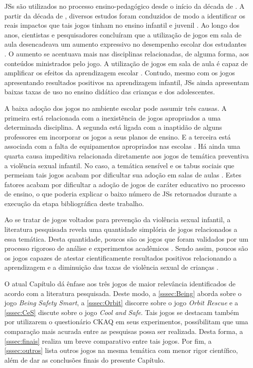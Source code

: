 \acfp{JS} são utilizados no processo ensino-pedagógico desde o início da década de \citeyear{clark1970serious}. A partir da década de \citeyear{clark1970serious}, diversos estudos foram conduzidos de modo a identificar os reais impactos que tais jogos tinham no ensino infantil e juvenil \cite{stieler2016paper}. Ao longo dos anos, cientistas e pesquisadores concluíram que a utilização de jogos em sala de aula desencadeava um aumento expressivo no desempenho escolar dos estudantes \cite{wentzel1998social}. O aumento se acentuava mais nas disciplinas relacionadas, de alguma forma, aos conteúdos ministrados pelo jogo. A utilização de jogos em sala de aula é capaz de amplificar os efeitos da aprendizagem escolar \cite{jones2020serious}. Contudo, mesmo com os jogos apresentando resultados positivos na aprendizagem infantil, \acp{JS} ainda apresentam baixas taxas de uso no ensino didático das crianças e dos adolescentes. 

A baixa adoção dos jogos no ambiente escolar pode assumir três causas. A primeira está relacionada com a inexistência de jogos apropriados a uma determinada disciplina. A segunda está ligada com a inaptidão de alguns professores em incorporar os jogos a seus planos de ensino. E a terceira está associada com a falta de equipamentos apropriados nas escolas \cite{colleen2016advancing}. Há ainda uma quarta causa impeditiva relacionada diretamente aos jogos de temática preventiva a violência sexual infantil. No caso, a temática sensível e os tabus sociais que permeiam tais jogos acabam por dificultar sua adoção em salas de aulas \cite{chen2007prevention}. Estes fatores acabam por dificultar a adoção de jogos de caráter educativo no processo de ensino, o que poderia explicar o baixo número de \acp{JS} retornados durante a execução da etapa bibliográfica deste trabalho.

Ao se tratar de jogos voltados para prevenção da violência sexual infantil, a literatura pesquisada revela uma quantidade simplória de jogos relacionados a essa temática. Desta quantidade, poucos são os jogos que foram validados por um processo rigoroso de análise e experimentos acadêmicos \cite{colleen2016advancing}. Sendo assim, poucos são os jogos capazes de atestar cientificamente resultados positivos relacionando a aprendizagem e a diminuição das taxas de violência sexual de crianças \cite{jones2010being}.

O atual Capítulo dá ênfase aos três jogos de maior relevância identificados de acordo com a literatura pesquisada. Deste modo, a \autoref{sssec:Being} aborda sobre o jogo \textit{Being Safety Smart}, a \autoref{sssec:Orbit} discorre sobre o jogo \textit{Orbit Rescue} e a \autoref{sssec:CeS} discute sobre o jogo \textit{Cool and Safe}. Tais jogos se destacam também por utilizarem o questionário \ac{CKAQ} em seus experimentos, possibilitam que uma comparação mais acurada entre as pesquisas possa ser realizada. Desta forma, a \autoref{sssec:finais} realiza um breve comparativo entre tais jogos. Por fim, a \autoref{sssec:outros} lista outros jogos na mesma temática com menor rigor científico, além de dar as conclusões finais do presente Capítulo. 

